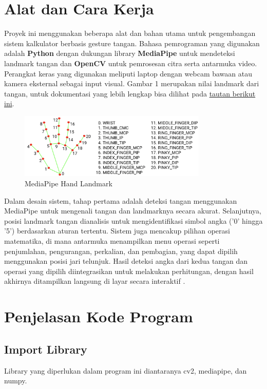 \documentclass[11pt,a4paper]{article}
\begin{document}
\section{Alat dan Cara Kerja}
Proyek ini menggunakan beberapa alat dan bahan utama untuk pengembangan sistem kalkulator berbasis gesture tangan. Bahasa pemrograman yang digunakan adalah \textbf{Python} dengan dukungan library \textbf{MediaPipe} untuk mendeteksi landmark tangan dan \textbf{OpenCV} untuk pemrosesan citra serta antarmuka video. Perangkat keras yang digunakan meliputi laptop dengan webcam bawaan atau kamera eksternal sebagai input visual. Gambar 1 merupakan nilai landmark dari tangan, untuk dokumentasi yang lebih lengkap bisa dilihat pada \href{https://ai.google.dev/edge/mediapipe/solutions/vision/hand_landmarker?hl=id}{tautan berikut ini}.
    
    \begin{figure}[H]
        \centering
        \includegraphics[width=0.8\textwidth]{Figure/hand-landmarks.png}
        \caption{MediaPipe Hand Landmark}
        \label{fig:mediapipe_hand_landmark}
    \end{figure}
    
Dalam desain sistem, tahap pertama adalah deteksi tangan menggunakan MediaPipe untuk mengenali tangan dan landmarknya secara akurat. Selanjutnya, posisi landmark tangan dianalisis untuk mengidentifikasi simbol angka ('0' hingga '5') berdasarkan aturan tertentu. Sistem juga mencakup pilihan operasi matematika, di mana antarmuka menampilkan menu operasi seperti penjumlahan, pengurangan, perkalian, dan pembagian, yang dapat dipilih menggunakan posisi jari telunjuk. Hasil deteksi angka dari kedua tangan dan operasi yang dipilih diintegrasikan untuk melakukan perhitungan, dengan hasil akhirnya ditampilkan langsung di layar secara interaktif \cite{Google2024}.
    
\section{Penjelasan Kode Program}
    \subsection{Import Library}
    Library yang diperlukan dalam program ini diantaranya cv2, mediapipe, dan numpy. 
\end{document}
